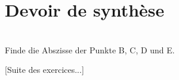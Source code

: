


\pagestyle{empty}
\section*{Devoir de synthèse}

\\
Finde die Abszisse der Punkte B, C, D und E.
\begin{DroiteGraduee}[none]{8}{0}{8}{2}{1}{0}{0}
[Suite des exercices...]
\end{DroiteGraduee}
